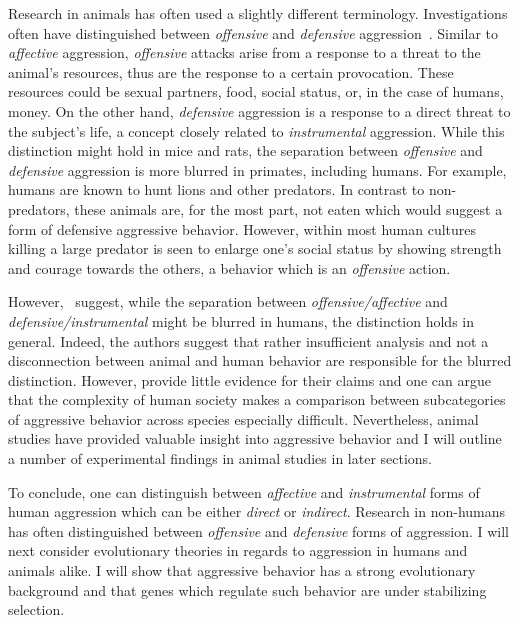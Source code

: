 Research in animals has often used a slightly different terminology.
Investigations often have distinguished between \textit{offensive} and \textit{defensive} aggression~\cite{Blanchard2005b}.
Similar to \textit{affective} aggression, \textit{offensive} attacks arise from a response to a threat to the animal's resources, thus are the response to a certain provocation.
These resources could be sexual partners, food, social status, or, in the case of humans, money.
On the other hand, \textit{defensive} aggression is a response to a direct threat to the subject's life, a concept closely related to \textit{instrumental} aggression.
While this distinction might hold in mice and rats, the separation between \textit{offensive} and \textit{defensive} aggression is more blurred in primates, including humans.
For example, humans are known to hunt lions and other predators.
In contrast to non-predators, these animals are, for the most part, not eaten which would suggest a form of defensive aggressive behavior.
However, within most human cultures killing a large predator is seen to enlarge one's social status by showing strength and courage towards the others,
a behavior which is an \textit{offensive} action.

However,~\citet{Blanchard2005b} suggest, while the separation between \textit{offensive/affective}  and \textit{defensive/instrumental} might be blurred in humans, the distinction holds in general.
Indeed, the authors suggest that rather insufficient analysis and not a disconnection between animal and human behavior are responsible for the blurred distinction.
However, \citet{Blanchard2005b} provide little evidence for their claims and one can argue that the complexity of human society makes a comparison between subcategories of aggressive behavior across species especially difficult. 
Nevertheless, animal studies have provided valuable insight into aggressive behavior and I will outline a number of experimental findings in animal studies in later sections.

To conclude, one can distinguish between \textit{affective} and \textit{instrumental} forms of human aggression which can be  either \textit{direct} or \textit{indirect}.
Research in non-humans has often distinguished between \textit{offensive} and \textit{defensive} forms of aggression.
I will next consider evolutionary theories in regards to aggression in humans and animals alike.
I will show that aggressive behavior has a strong evolutionary background and that genes which regulate such behavior are under stabilizing selection.

